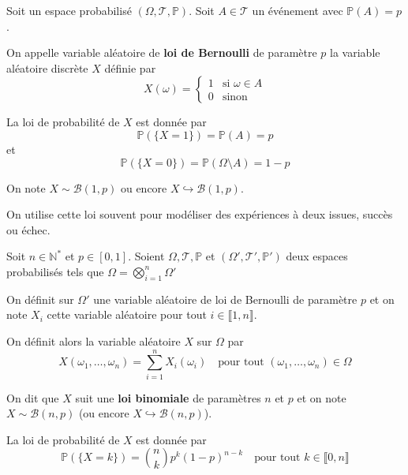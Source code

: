 \documentclass[a4paper,12pt]{article}
\begin{document}
\begin{definition}
    Soit un espace probabilisé $(\Omega, \mathcal{T}, \mathbb{P})$.
    Soit $A \in \mathcal{T}$ un événement avec $\mathbb{P}(A) = p$.

    On appelle variable aléatoire de \textbf{loi de Bernoulli} de paramètre $p$ la variable aléatoire discrète $X$ définie par
    $$
    X(\omega) = \begin{cases}
    1 & \text{si } \omega \in A \\
    0 & \text{sinon}
    \end{cases}
    $$

    La loi de probabilité de $X$ est donnée par
    $$
    \mathbb{P}(\{ X = 1 \}) = \mathbb{P}(A) = p
    $$
    et
    $$
    \mathbb{P}(\{ X = 0 \}) = \mathbb{P}(\Omega \setminus A) = 1 - p
    $$

    On note $X \sim \mathcal{B}(1, p)$ ou encore $X \hookrightarrow \mathcal{B}(1, p)$.
\end{definition}

\begin{remarque}
    On utilise cette loi souvent pour modéliser des expériences à deux issues, succès ou échec.
\end{remarque}

\begin{definition}
    Soit $n \in \mathbb{N}^*$ et $p \in [0, 1]$.
    Soient $\Omega, \mathcal{T}, \mathbb{P}$ et $(\Omega', \mathcal{T}', \mathbb{P}')$ deux espaces probabilisés tels que $\Omega = \bigotimes_{i=1}^n \Omega'$

    On définit sur $\Omega'$ une variable aléatoire de loi de Bernoulli de paramètre $p$ et on note $X_i$ cette variable aléatoire pour tout $i \in \llbracket 1, n \rrbracket$.

    On définit alors la variable aléatoire $X$ sur $\Omega$ par
    $$
    X(\omega_1, \ldots, \omega_n) = \sum_{i=1}^n X_i(\omega_i) \quad \text{pour tout } (\omega_1, \ldots, \omega_n) \in \Omega
    $$

    On dit que $X$ suit une \textbf{loi binomiale} de paramètres $n$ et $p$ et on note $X \sim \mathcal{B}(n, p)$ (ou encore $X \hookrightarrow \mathcal{B}(n, p)$).

    La loi de probabilité de $X$ est donnée par
    $$
    \mathbb{P}(\{ X = k \}) = \binom{n}{k} p^k (1-p)^{n-k} \quad \text{pour tout } k \in \llbracket 0, n \rrbracket
    $$
\end{definition}
\end{document}
